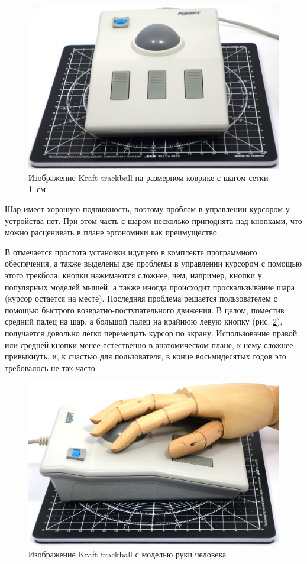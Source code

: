 \documentclass[11pt, a4paper]{article}
\begin{document}
\begin{figure}[h]
    \centering
    \includegraphics[scale=0.25]{1989_kraft_trackball/size_30.jpg}
    \caption{Изображение Kraft trackball на размерном коврике с шагом сетки 1~см}
    \label{fig:KraftSize}
\end{figure}

Шар имеет хорошую подвижность, поэтому проблем в управлении курсором у устройства нет. При этом часть с шаром несколько приподнята над кнопками, что можно расценивать в плане эргономики как преимущество.

В \cite{Hudnall} отмечается простота установки идущего в комплекте программного обеспечения, а также выделены две проблемы в управлении курсором с помощью этого трекбола: кнопки нажимаются сложнее, чем, например, кнопки у популярных моделей мышей, а также иногда происходит проскальзывание шара (курсор остается на месте). Последняя проблема решается пользователем с помощью быстрого возвратно-поступательного движения. В целом, поместив средний палец на шар, а большой палец на крайнюю левую кнопку (рис. \ref{fig:KraftHand}), получается довольно легко перемещать курсор по экрану. Использование правой или средней кнопки менее естественно в анатомическом плане, к нему сложнее привыкнуть, и, к счастью для пользователя, в конце восьмидесятых годов это требовалось не так часто.

\begin{figure}[h]
    \centering
    \includegraphics[scale=0.25]{1989_kraft_trackball/hand_30.jpg}
    \caption{Изображение Kraft trackball с моделью руки человека}
    \label{fig:KraftHand}
\end{figure}
\end{document}
